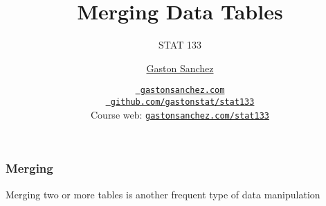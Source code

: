 \documentclass[12pt]{beamer}\usepackage[]{graphicx}\usepackage[]{color}
\title{Merging Data Tables}
\subtitle{STAT 133}
\author{\href{http://www.gastonsanchez.com}{Gaston Sanchez}}
\institute{Department of Statistics, UC{\textendash}Berkeley}
\date{\href{http://www.gastonsanchez.com}{\tt \scriptsize \color{foreground} gastonsanchez.com}
\\[-4pt]
\href{http://github.com/gastonstat/stat133}{\tt \scriptsize \color{foreground} github.com/gastonstat/stat133}
\\[-4pt]
{\scriptsize Course web: \href{http://www.gastonsanchez.com/stat133}{\tt gastonsanchez.com/stat133}}
}
\begin{document}
{
  \frame{
    \titlepage
  } 
}


\begin{frame}
\begin{center}
\Huge{}
\end{center}
\end{frame}


\begin{frame}[fragile]
\frametitle{Merging}

{\Large 
 Merging two or more tables is another frequent type of data manipulation
}

\end{frame}

\end{document}
